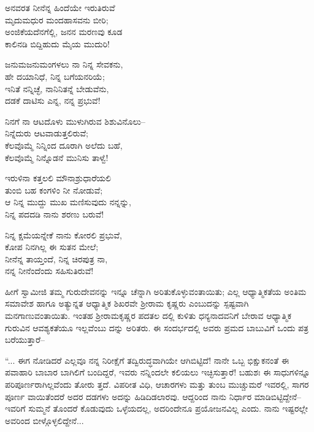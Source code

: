 \begin{myquote}
ಅನವರತ ನೀನೆನ್ನ ಹಿಂದೆಯೇ ಇರುತಿರುವೆ\\ಮೃದುಮಧುರ ಮಂದಹಾಸವನು ಬೀರಿ;\\ಅಂಜಿಕೆಯದೆನಗೆಲ್ಲಿ, ಜನನ ಮರಣವು ಕೂಡ\\ಕಾಲಿನಡಿ ಬಿದ್ದಿಹುದು ಮೈಯ ಮುದುರಿ!
\end{myquote}

\begin{myquote}
ಜನುಮಜನುಮಂಗಳಲು ನಾ ನಿನ್ನ ಸೇವಕನು,\\ಹೇ ದಯಾನಿಧೆ, ನಿನ್ನ ಬಗೆಯನರಿಯೆ; \\ಇನಿತೆ ನನ್ನಿಚ್ಛೆ, ನಾನಿನಿತನ್ನೆ ಬೇಡುವೆನು, \\ದಡಕೆ ದಾಟಿಸು ಎನ್ನ, ನನ್ನ ಪ್ರಭುವೆ!
\end{myquote}

\begin{myquote}
ನಿನಗೆ ನಾ ಆಟದೊಳು ಮುಳುಗಿರುವ ಶಿಶುವಿನೊಲು–\\ನಿನ್ನೆದುರು ಆಟವಾಡುತ್ತಲಿರುವೆ;\\ಕೆಲವೊಮ್ಮೆ ನಿನ್ನಿಂದ ದೂರಾಗಿ ಅಲೆದು ಬಹೆ,\\ಕೆಲವೊಮ್ಮೆ ನಿನ್ನೊಡನೆ ಮುನಿಸು ತಾಳ್ವೆ!
\end{myquote}

\begin{myquote}
ಇರುಳಿನಾ ಕತ್ತಲಲಿ ಮೌನಾಶ್ರುಧಾರೆಯಲಿ\\ತುಂಬಿ ಬಹ ಕಂಗಳಿಂ ನೀ ನೋಡುವೆ;\\ಆ ನಿನ್ನ ಮುದ್ದು ಮುಖ ಮಣಿಸುವುದು ನನ್ನನ್ನು,\\ನಿನ್ನ ಪದದಡಿ ನಾನು ಶರಣು ಬರುವೆ!
\end{myquote}

\begin{myquote}
ನಿನ್ನ ಕ್ಷಮೆಯನ್ನೇಕೆ ನಾನು ಕೋರಲಿ ಪ್ರಭುವೆ,\\ಕೋಪ ನಿನಗಿಲ್ಲ ಈ ಸುತನ ಮೇಲೆ;\\ನೀನೆನ್ನ ತಾಯ್ತಂದೆ, ನಿನ್ನ ಚಿರಪುತ್ರ ನಾ,\\ನನ್ನ ನೀನೆಂದೆಂದು ಸಹಿಸುತಿರುವೆ!
\end{myquote}

\noindent

ಹೀಗೆ ಸ್ವಾಮೀಜಿ ತಮ್ಮ ಗುರುದೇವನನ್ನು ಇನ್ನೂ ಚೆನ್ನಾಗಿ ಅರಿತುಕೊಳ್ಳುವಂತಾಯಿತು; ಎಲ್ಲ ಆಧ್ಯಾತ್ಮಿಕತೆಯ ಅಂತಿಮ ಸಮಾವೇಶ ಹಾಗೂ ಅತ್ಯುನ್ನತ ಆಧ್ಯಾತ್ಮಿಕ ಶಿಖರವೇ ಶ್ರೀರಾಮ ಕೃಷ್ಣರು ಎಂಬುದನ್ನು ಸ್ಪಷ್ಟವಾಗಿ ಮನಗಾಣುವಂತಾಯಿತು. ಇಂತಹ ಶ್ರೀರಾಮಕೃಷ್ಣರ ಪದತಲ ದಲ್ಲಿ ಕುಳಿತು ಧನ್ಯನಾದವನಿಗೆ ಬೇರಾವ ಆಧ್ಯಾತ್ಮಿಕ ಗುರುವಿನ ಆವಶ್ಯಕತೆಯೂ ಇಲ್ಲವೆಂಬು ದನ್ನು ಅರಿತರು. ಈ ಸಂದರ್ಭದಲ್ಲಿ ಅವರು ಪ್ರಮದ ಬಾಬುವಿಗೆ ಒಂದು ಪತ್ರ ಬರೆಯುತ್ತಾರೆ–

“... ಈಗ ನೋಡಿದರೆ ಎಲ್ಲವೂ ನನ್ನ ನಿರೀಕ್ಷೆಗೆ ತದ್ವಿರುದ್ಧವಾಗಿಯೇ ಆಗಿಬಿಟ್ಟಿದೆ! ನಾನೇ ಒಬ್ಬ ಭಿಕ್ಷುಕನಂತೆ ಈ ಪವಾಹಾರಿ ಬಾಬಾರ ಬಾಗಿಲಿಗೆ ಬಂದಿದ್ದರೆ, ಇವರು ನನ್ನಿಂದಲೇ ಕಲಿಯಲು ಇಚ್ಛಿಸುತ್ತಾರೆ! ಬಹುಶಃ ಈ ಸಾಧುಗಳಿನ್ನೂ ಪರಿಪೂರ್ಣರಾಗಿಲ್ಲವೆಂದು ತೋರು ತ್ತದೆ. ವಿಪರೀತ ವಿಧಿ, ಆಚಾರಗಳು ಮತ್ತು ತುಂಬ ಮುಚ್ಚುಮರೆ ಇವರಲ್ಲಿ, ಸಾಗರ ಪೂರ್ಣ ವಾಯಿತೆಂದರೆ ಅದರ ದಡಗಳು ಅದನ್ನು ಹಿಡಿದಿಡಲಾರವು. ಆದ್ದರಿಂದ ನಾನು ನಿರ್ಧಾರ ಮಾಡಿಬಿಟ್ಟಿದ್ದೇನೆ–ಇವರಿಗೆ ಸುಮ್ಮನೆ ತೊಂದರೆ ಕೊಡುವುದು ಒಳ್ಳೆಯದಲ್ಲ, ಅದರಿಂದೇನೂ ಪ್ರಯೋಜನವಿಲ್ಲ ಎಂದು. ನಾನು ಇಷ್ಟರಲ್ಲೇ ಅವರಿಂದ ಬೀಳ್ಗೊಳ್ಳಲಿದ್ದೇನೆ...

